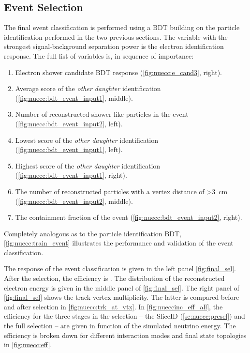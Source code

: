 \subsection{Event Selection}
\label{sc:nuecc:sel}

The final \nuecc event classification is performed using a BDT building on the particle identification performed in the two previous sections. The variable with the strongest signal-background separation power is the electron identification response. The full list of variables is, in sequence of importance:
\begin{enumerate}
    \item Electron shower candidate BDT response (\cref{fig:nuecc:e_cand3}, right).
    \item Average score of the \textit{other daughter} identification (\cref{fig:nuecc:bdt_event_input1}, middle).
    \item Number of reconstructed shower-like particles in the event (\cref{fig:nuecc:bdt_event_input2}, left).
    \item Lowest score of the \textit{other daughter} identification (\cref{fig:nuecc:bdt_event_input1}, left).
    \item Highest score of the \textit{other daughter} identification (\cref{fig:nuecc:bdt_event_input1}, right).
    \item The number of reconstructed particles with a vertex distance of \SI{>3}{\cm} (\cref{fig:nuecc:bdt_event_input2}, middle).
    \item The containment fraction of the event (\cref{fig:nuecc:bdt_event_input2}, right).
\end{enumerate}
Completely analogous as to the particle identification BDT, \cref{fig:nuecc:train_event} illustrates the performance and validation of the event classification.
\par
The response of the event classification is given in the left panel \cref{fig:final_sel}. After the selection, the efficiency is . The distribution of the reconstructed electron energy is given in the middle panel of \cref{fig:final_sel}. The right panel of \cref{fig:final_sel} shows the track vertex multiplicity. The latter is compared before and after selection in \cref{fig:nuecc:trk_at_vtx}. In \cref{fig:nueccinc_eff_all}, the efficiency for the three stages in the selection -- the SliceID (\cref{sc:nuecc:presel}) and the full \nuecc selection -- are given in function of the simulated neutrino energy. The efficiency is broken down for different interaction modes and final state topologies in \cref{fig:nuecc:eff}.
